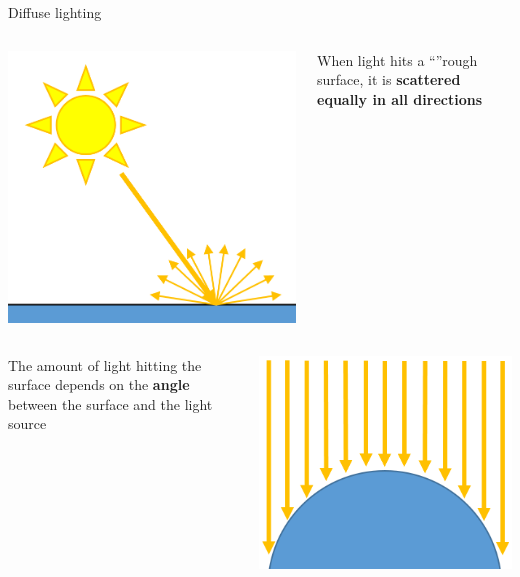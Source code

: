 \begin{frame}{Diffuse lighting}
	\pause
	\begin{columns}
		\begin{column}{0.33\textwidth}
			\includegraphics[width=\textwidth]{diffuse_1}
		\end{column}
		\begin{column}{0.65\textwidth}
			When light hits a ``''rough surface, it is \textbf{scattered equally in all directions}
		\end{column}
	\end{columns}
	\pause
	\begin{columns}
		\begin{column}{0.65\textwidth}
			The amount of light hitting the surface depends on the \textbf{angle} between the surface and the light source
		\end{column}
		\begin{column}{0.33\textwidth}
			\includegraphics[width=\textwidth]{diffuse_2}

\end{column}
\end{columns}
\end{frame}
